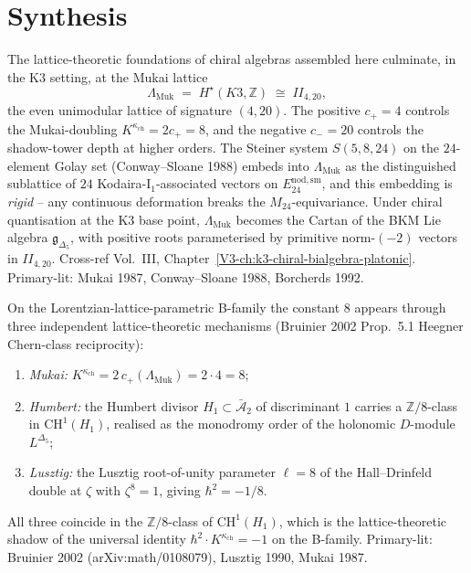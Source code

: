 \section{Synthesis}
\label{sec:latfnd-supplement}

\begin{remark}[The Mukai lattice $\Lambda_{\mathrm{Muk}} = II_{4,20}$ and $S(5,8,24)$]
\label{rem:latfnd-1}
The lattice-theoretic foundations of chiral algebras assembled here
culminate, in the K3 setting, at the Mukai lattice
\[
\Lambda_{\mathrm{Muk}} \;=\; H^\star(K3,\mathbb Z) \;\cong\; II_{4,20},
\]
the even unimodular lattice of signature $(4,20)$. The positive $c_+ = 4$
controls the Mukai-doubling $K^{\kappa_{\mathrm{ch}}} = 2c_+ = 8$, and
the negative $c_- = 20$ controls the shadow-tower depth at higher orders.
The Steiner system $S(5,8,24)$ on the $24$-element Golay set
(Conway--Sloane 1988) embeds into $\Lambda_{\mathrm{Muk}}$ as the
distinguished sublattice of $24$ Kodaira-I$_1$-associated vectors on
$E^{\mathrm{nod,sm}}_{24}$, and this embedding is \emph{rigid} -- any
continuous deformation breaks the $M_{24}$-equivariance. Under
chiral quantisation at the K3 base point, $\Lambda_{\mathrm{Muk}}$ becomes the
Cartan of the BKM Lie algebra $\mathfrak g_{\Delta_5}$, with positive
roots parameterised by primitive norm-$(-2)$ vectors in $II_{4,20}$.
Cross-ref Vol.~III, Chapter~\ref{V3-ch:k3-chiral-bialgebra-platonic}.
Primary-lit: Mukai 1987, Conway--Sloane 1988, Borcherds 1992.
\end{remark}

\begin{remark}
\label{rem:latfnd-2}
On the Lorentzian-lattice-parametric B-family the constant $8$ appears
through three independent lattice-theoretic mechanisms (Bruinier 2002
Prop.~5.1 Heegner Chern-class reciprocity):
\begin{enumerate}
\item \emph{Mukai:} $K^{\kappa_{\mathrm{ch}}} = 2\, c_+(\Lambda_{\mathrm{Muk}}) = 2\cdot 4 = 8$;
\item \emph{Humbert:} the Humbert divisor $H_1\subset\bar{\mathcal A}_2$
 of discriminant $1$ carries a $\mathbb Z/8$-class in
 $\mathrm{CH}^1(H_1)$, realised as the monodromy order of the
 holonomic $D$-module $L^{\Delta_5}$;
\item \emph{Lusztig:} the Lusztig root-of-unity parameter $\ell = 8$
 of the Hall--Drinfeld double at $\zeta$ with $\zeta^8 = 1$, giving
 $\hbar^2 = -1/8$.
\end{enumerate}
All three coincide in the $\mathbb Z/8$-class of $\mathrm{CH}^1(H_1)$,
which is the lattice-theoretic shadow of the universal identity
$\hbar^2 \cdot K^{\kappa_{\mathrm{ch}}} = -1$ on the B-family.
Primary-lit: Bruinier 2002 (arXiv:math/0108079), Lusztig 1990, Mukai 1987.
\end{remark}

